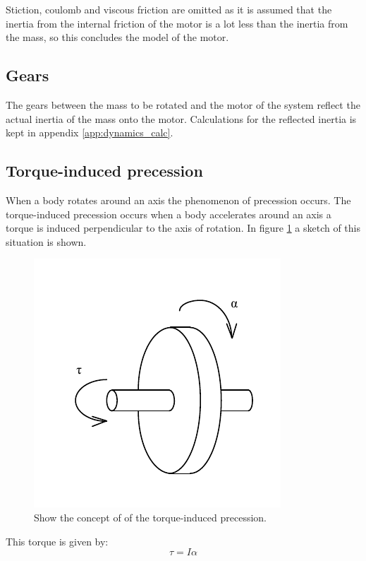 Stiction, coulomb and viscous friction are omitted as it is assumed that the inertia from the internal friction of the motor is a lot less than the inertia from the mass, so this concludes the model of the motor.

\subsection{Gears}
The gears between the mass to be rotated and the motor of the system reflect the actual inertia of the mass onto the motor. Calculations for the reflected inertia is kept in appendix \ref{app:dynamics_calc}.
  
\subsection{Torque-induced precession}
When a body rotates around an axis the phenomenon of precession occurs. The torque-induced precession occurs when a body accelerates around an axis a torque is induced perpendicular to the axis of rotation. In figure \ref{fig:precession} a sketch of this situation is shown.
\begin{figure}[htb]
	\begin{center}
	\includegraphics[scale=1,trim=0 0 0 0]{graphics/precession.pdf} %
	\caption{Show the concept of of the torque-induced precession.}
	\label{fig:precession}			%
	\end{center}
\end{figure}
This torque is given by:
\begin{equation}
	\tau = I\alpha\label{eq:induced_torque}
\end{equation}
